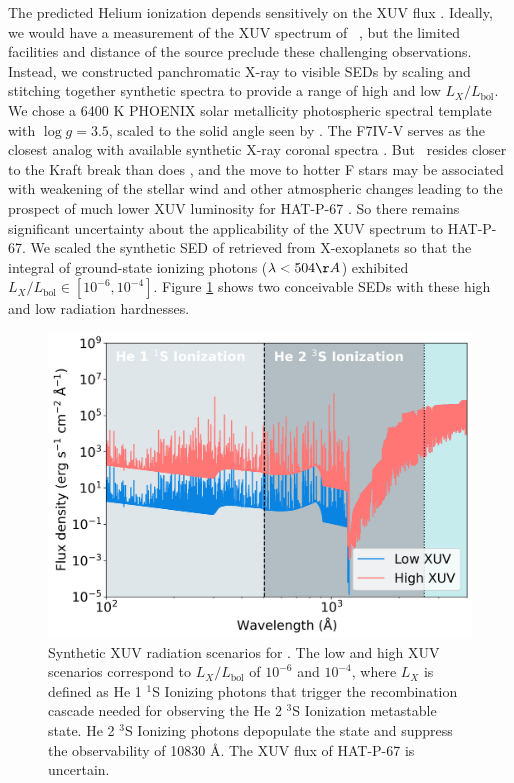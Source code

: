 \documentclass[twocolumn]{aastex631}
\newcommand{\hatp}{\object{HAT-P-67}~}
\newcommand{\hatpb}{\object{HAT-P-67 b}}
\begin{document}
The predicted Helium ionization depends sensitively on the XUV flux \citep{2019ApJ...881..133O}.  Ideally, we would have a measurement of the XUV spectrum of \hatp, but the limited facilities and distance of the source preclude these challenging observations.  Instead, we constructed panchromatic X-ray to visible SEDs by scaling and stitching together synthetic spectra to provide a range of high and low $L_X/L_\mathrm{bol}$.  We chose a 6400 K PHOENIX \citep{husser13} solar metallicity photospheric spectral template with $\log{g}=3.5$, scaled to the solid angle seen by \hatpb.  The F7IV-V  serves as the closest analog with available synthetic X-ray coronal spectra \citep{2011A&A...532A...6S}.  But \hatp resides closer to the Kraft break than does , and the move to hotter F stars may be associated with weakening of the stellar wind and other atmospheric changes leading to the prospect of much lower XUV luminosity for HAT-P-67 \citep{2022ApJ...930....7A}.  So there remains significant uncertainty about the applicability of the  XUV spectrum to HAT-P-67.  We scaled the synthetic SED of  retrieved from X-exoplanets \citep{2011A&A...532A...6S} so that the integral of ground-state ionizing photons ($\lambda<504\AA$) exhibited $L_X/L_\mathrm{bol} \in [10^{-6}, 10^{-4}]$.  Figure \ref{fig:XUV} shows two conceivable SEDs with these high and low radiation hardnesses.

\begin{figure}
    \includegraphics[width=\linewidth]{figures/XUV_flux_schematic.png}
    \caption{Synthetic XUV radiation scenarios for \hatpb.  The low and high XUV scenarios correspond to $L_X/L_\mathrm{bol}$ of $10^{-6}$ and $10^{-4}$, where $L_X$ is defined as He 1 $^1$S Ionizing photons that trigger the recombination cascade needed for observing the He 2 $^3$S Ionization metastable state.  He 2 $^3$S Ionizing photons depopulate the state and suppress the observability of  10830 \AA.  The XUV flux of HAT-P-67 is uncertain.}
    \label{fig:XUV}
\end{figure}
\end{document}
